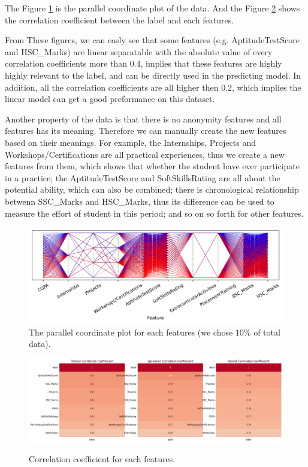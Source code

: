 \documentclass[11pt]{article}
\begin{document}
The Figure \ref{task-1-data-distribution} is the parallel coordinate plot of the data. And the Figure \ref{task-1-correlation-coefficient} shows the correlation coefficient between the label and each features.

From These figures, we can easly see that some features (e.g. AptitudeTestScore and HSC\_Marks) are linear separatable with the absolute value of every correlation coefficients more than $0.4$, implies that these features are highly highly relevant to the label, and can be directly used in the predicting model. In addition, all the correlation coefficients are all higher then $0.2$, which implies the linear model can get a good preformance on this dataset.

Another property of the data is that there is no anonymity features and all features has its meaning. Therefore we can manually create the new features based on their meanings. For example, the Internships, Projects and Workshops/Certifications are all practical experiences, thus we create a new features from them, which shows that whether the student have ever participate in a practice; the AptitudeTestScore and SoftSkillsRating are all about the potential ability, which can also be combined; there is chronological relationship betwenn SSC\_Marks and HSC\_Marks, thus its difference can be used to measure the effort of student in this period; and so on so forth for other features.

\begin{figure}[H]
  \centering
  \includegraphics[width=\textwidth]{../code/Task1/Analysis/PC.jpg}
  \caption{The parallel coordinate plot for each features (we chose $10\%$ of total data).}
  \label{task-1-data-distribution}
\end{figure}

\begin{figure}[H]
  \centering
  \includegraphics[width=\textwidth]{../code/Task1/Analysis/corrcoef.jpg} \\
  \caption{Correlation coefficient for each features.}
  \label{task-1-correlation-coefficient}
\end{figure}
\end{document}
